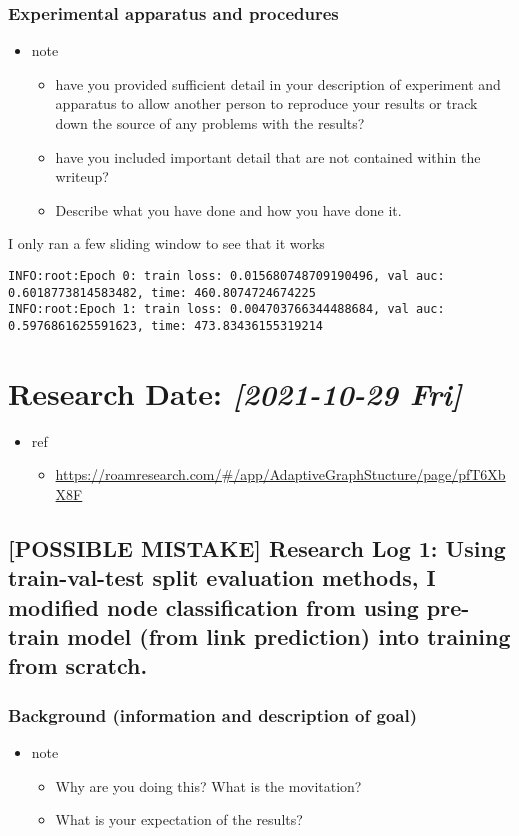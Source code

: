 \documentclass[11pt]{article}
\begin{document}
\subsubsection{Experimental apparatus and procedures}
\label{sec:org4965fdf}
\begin{itemize}
\item note
\begin{itemize}
\item have you provided sufficient detail in your description of experiment and apparatus to allow another person to reproduce your results or track down the source of any problems with the results?
\item have you included important detail that are not contained within the writeup?
\item Describe what you have done and how you have done it.
\end{itemize}
\end{itemize}

I only ran a few sliding window to see that it works
\begin{verbatim}
INFO:root:Epoch 0: train loss: 0.015680748709190496, val auc: 0.6018773814583482, time: 460.8074724674225
INFO:root:Epoch 1: train loss: 0.004703766344488684, val auc: 0.5976861625591623, time: 473.83436155319214
\end{verbatim}
\section{Research Date: \textit{[2021-10-29 Fri]}}
\label{sec:org521101a}
\begin{itemize}
\item ref
\begin{itemize}
\item \url{https://roamresearch.com/\#/app/AdaptiveGraphStucture/page/pfT6XbX8F}
\end{itemize}
\end{itemize}
\subsection{[POSSIBLE MISTAKE] Research Log 1: Using train-val-test split evaluation methods, I modified node classification from using pre-train model (from link prediction) into training from scratch.}
\label{sec:orgf948549}
\subsubsection{Background (information and description of goal)}
\label{sec:org0fae829}
\begin{itemize}
\item note
\begin{itemize}
\item Why are you doing this? What is the movitation?
\item What is your expectation of the results?
\end{itemize}
\end{itemize}
\end{document}
